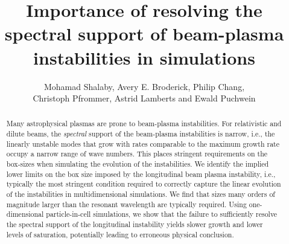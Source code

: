 \documentclass[pop,numberedappendix,iop]{aeb_emulateapj_2015}
\begin{document}
\author
{
Mohamad Shalaby, 
Avery E. Broderick, 
Philip Chang,
\\
Christoph Pfrommer, 
Astrid Lamberts
and
Ewald Puchwein}







\title{Importance of resolving the spectral support of beam-plasma instabilities in simulations}


 

\begin{abstract}

Many astrophysical plasmas are prone to beam-plasma instabilities.
For relativistic and dilute beams, the {\it spectral} support of the beam-plasma instabilities is  narrow, i.e., the linearly unstable modes that grow with rates comparable to the maximum growth rate occupy a narrow range of wave numbers.
This places stringent requirements on the box-sizes
when simulating the evolution of the instabilities.
We identify the implied lower limits on the box size imposed by the longitudinal beam plasma instability, i.e., typically the most stringent condition required to correctly capture the linear evolution of the instabilities in multidimensional simulations.
We find that sizes many orders of magnitude larger than the resonant wavelength are typically required.
Using one-dimensional particle-in-cell simulations, we show that the failure to sufficiently resolve the spectral support of the longitudinal instability yields slower growth and lower levels of saturation,
potentially leading to erroneous physical conclusion.

\end{abstract}
\end{document}

